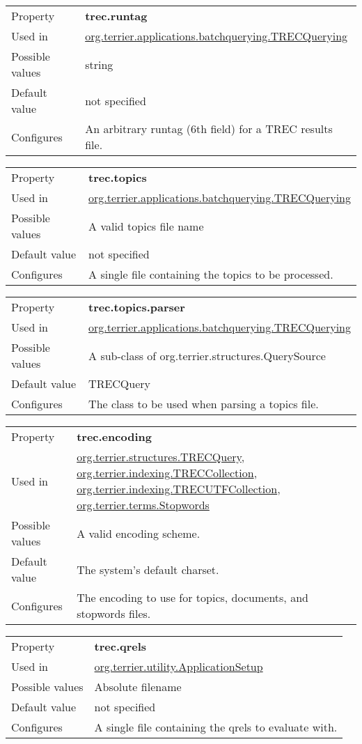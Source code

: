 \begin{longtable}[]{@{}ll@{}}
\toprule
Property & \textbf{trec.runtag}\tabularnewline
Used in &
\href{javadoc/org/terrier/applications/batchquerying/TRECQuerying.html}{org.terrier.applications.batchquerying.TRECQuerying}\tabularnewline
Possible values & string\tabularnewline
Default value & not specified\tabularnewline
Configures & An arbitrary runtag (6th field) for a TREC results
file.\tabularnewline
\bottomrule
\end{longtable}

\begin{longtable}[]{@{}ll@{}}
\toprule
Property & \textbf{trec.topics}\tabularnewline
Used in &
\href{javadoc/org/terrier/applications/batchquerying/TRECQuerying.html}{org.terrier.applications.batchquerying.TRECQuerying}\tabularnewline
Possible values & A valid topics file name\tabularnewline
Default value & not specified\tabularnewline
Configures & A single file containing the topics to be
processed.\tabularnewline
\bottomrule
\end{longtable}

\begin{longtable}[]{@{}ll@{}}
\toprule
Property & \textbf{trec.topics.parser}\tabularnewline
Used in &
\href{javadoc/org/terrier/applications/batchquerying/TRECQuerying.html}{org.terrier.applications.batchquerying.TRECQuerying}\tabularnewline
Possible values & A sub-class of
org.terrier.structures.QuerySource\tabularnewline
Default value & TRECQuery\tabularnewline
Configures & The class to be used when parsing a topics
file.\tabularnewline
\bottomrule
\end{longtable}

\begin{longtable}[]{@{}ll@{}}
\toprule
Property & \textbf{trec.encoding}\tabularnewline
Used in &
\href{javadoc/org/terrier/structures/TRECQuery.html}{org.terrier.structures.TRECQuery},
\href{javadoc/org/terrier/indexing/TRECCollection.html}{org.terrier.indexing.TRECCollection},
\href{javadoc/org/terrier/indexing/TRECUTFCollection.html}{org.terrier.indexing.TRECUTFCollection},
\href{javadoc/org/terrier/terms/Stopwords.html}{org.terrier.terms.Stopwords}\tabularnewline
Possible values & A valid encoding scheme.\tabularnewline
Default value & The system's default charset.\tabularnewline
Configures & The encoding to use for topics, documents, and stopwords
files.\tabularnewline
\bottomrule
\end{longtable}

\begin{longtable}[]{@{}ll@{}}
\toprule
Property & \textbf{trec.qrels}\tabularnewline
Used in &
\href{javadoc/org/terrier/utility/ApplicationSetup.html}{org.terrier.utility.ApplicationSetup}\tabularnewline
Possible values & Absolute filename\tabularnewline
Default value & not specified\tabularnewline
Configures & A single file containing the qrels to evaluate
with.\tabularnewline
\bottomrule
\end{longtable}

